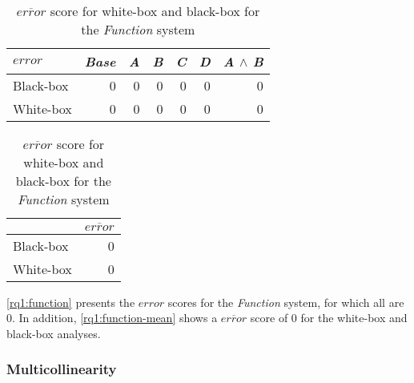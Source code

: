 \begin{table}[H]
    \begin{minipage}{.5\linewidth}
        \centering
        \begin{tabular}{lrrrrrr}    \toprule
        $error$     & \emph{Base} & \emph{A} & \emph{B} & \emph{C} & \emph{D} & \emph{A} $\land$ \emph{B}   \\ \midrule
        Black-box & 0 & 0 & 0 & 0 & 0 & 0      \\
        White-box & 0 & 0 & 0 & 0 & 0 & 0      \\ \bottomrule
        \end{tabular}
        \caption{Respective \emph{error} scores for white-box and black-box {\perfInfluenceModel}s for the \emph{Function} system.}
        \label{rq1:function}
    \end{minipage}%
    \hspace{7mm}
    \begin{minipage}{.37\linewidth}
        \centering
        \begin{tabular}{lr}
            \toprule
                      & $\overline{error}$   \\ \midrule
            Black-box & 0              \\
            White-box & 0              \\ \bottomrule
            \end{tabular}
            \caption{$\overline{error}$ score for white-box and black-box for the \emph{Function} system}
            \label{rq1:function-mean}
        \end{minipage}
    \end{table}

\autoref{rq1:function} presents the $error$ scores for the \emph{Function} system, for which all are $0$. In addition, 
\autoref{rq1:function-mean} shows a $\overline{error}$ score of $0$ for the white-box and black-box analyses.
    
    \subsubsection*{Multicollinearity}

